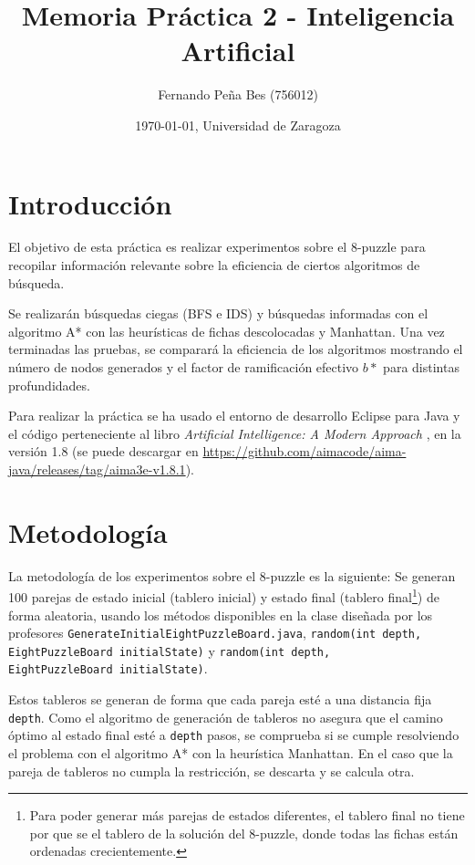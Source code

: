 \documentclass[a4paper, 10pt]{article}
\author{Fernando Peña Bes (756012)}
\title{Memoria Práctica 2 - Inteligencia Artificial}
\date{\today, Universidad de Zaragoza}
\begin{document}
\maketitle

\section{Introducción} 
El objetivo de esta práctica es realizar experimentos sobre el 8-puzzle para recopilar información relevante sobre la eficiencia de ciertos algoritmos de búsqueda.

Se realizarán búsquedas ciegas (BFS e IDS) y búsquedas informadas con el algoritmo A* con las heurísticas de fichas descolocadas y Manhattan. Una vez terminadas las pruebas, se comparará la eficiencia de los algoritmos mostrando el número de nodos generados y el factor de ramificación efectivo $b*$ para distintas profundidades.

Para realizar la práctica se ha usado el entorno de desarrollo Eclipse para Java y el código perteneciente al libro \textit{Artificial Intelligence: A Modern Approach} \cite{AIMA}, en la versión 1.8 (se puede descargar en \url{https://github.com/aimacode/aima-java/releases/tag/aima3e-v1.8.1}).

\section{Metodología}
La metodología de los experimentos sobre el 8-puzzle es la siguiente: Se generan 100 parejas de estado inicial (tablero inicial) y estado final (tablero final\footnote{Para poder generar más parejas de estados diferentes, el tablero final no tiene por que se el tablero de la solución del 8-puzzle, donde todas las fichas están ordenadas crecientemente.}) de forma aleatoria, usando los métodos disponibles en la clase diseñada por los profesores \texttt{GenerateInitialEightPuzzleBoard.java}, \texttt{random(int depth, EightPuzzleBoard initialState)} y \texttt{random(int depth, \\EightPuzzleBoard initialState)}. 

Estos tableros se generan de forma que cada pareja esté a una distancia fija \texttt{depth}. Como el algoritmo de generación de tableros no asegura que el camino óptimo al estado final esté a \texttt{depth} pasos, se comprueba si se cumple resolviendo el problema con el algoritmo A* con la heurística Manhattan. En el caso que la pareja de tableros no cumpla la restricción, se descarta y se calcula otra. 
\end{document}
